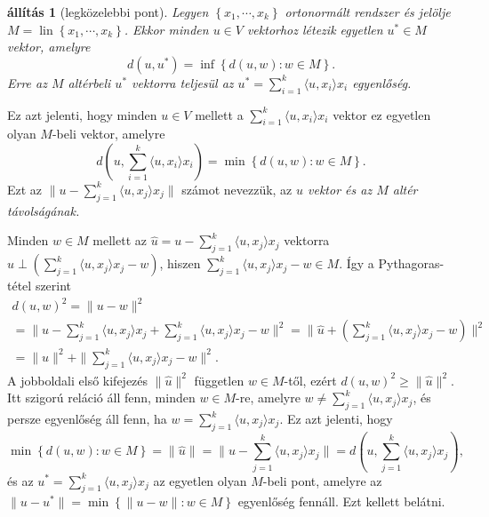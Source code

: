 \documentclass[9pt, a4paper, showtrims]{memoir}
\makeatletter
\renewenvironment{proof}[1][\proofname]
    {\par\pushQED{\qed}%
    \normalfont \topsep6\p@\@plus6\p@\relax
    \trivlist
    \item[\hskip\labelsep
        \itshape
    #1\@addpunct{:}]\ignorespaces}
    {\popQED\endtrivlist\@endpefalse}
\theoremstyle{plain}
\newtheorem{proposition}{állítás}[chapter]
\theoremstyle{remark}
\theoremstyle{definition}
\DeclareMathOperator{\lin}{lin}
\newcommand{\ip}[2]{\langle#1,#2\rangle}
\makeatother
\begin{document}
\begin{proposition}[legközelebbi pont]\label{pr:legkozelebb}
	Legyen $\left\{ x_1,\cdots,x_k \right\}$ ortonormált rendszer és
	jelölje $M=\lin\left\{ x_1,\cdots,x_k \right\}$.
	Ekkor minden $u\in V$ vektorhoz létezik egyetlen $u^\ast\in M$
	vektor, amelyre
	\[
		d\left( u,u^\ast\right)
		=
		\inf\left\{ d\left( u,w \right):w\in M \right\}.
	\]
	Erre az $M$ altérbeli $u^\ast$ vektorra teljesül az $u^\ast=\sum_{i=1}^k\ip{u}{x_i}x_i$ egyenlőség.
\end{proposition}
Ez azt jelenti,
hogy minden $u\in V$ mellett a
$\sum_{i=1}^k\ip{u}{x_i}x_i$
vektor ez egyetlen olyan $M$-beli vektor, amelyre
\[
	d\left( u,\sum_{i=1}^k\ip{u}{x_i}x_i \right)
	=
	\min\left\{ d\left( u,w \right):w\in M \right\}.
\]
Ezt az
\begin{math}
	\|u-\sum_{j=1}^k\ip{u}{x_j}x_j\|
\end{math}
számot nevezzük, az \emph{$u$ vektor és az $M$ altér távolságának.}
\begin{proof}
	Minden $w\in M$ mellett az $\hat{u}=u-\sum_{j=1}^k\ip{u}{x_j}x_j$ vektorra
	$\hat{u}\perp \left( \sum_{j=1}^k\ip{u}{x_j}x_j-w \right)$,
	hiszen $\sum_{j=1}^k\ip{u}{x_j}x_j-w\in M$.
	Így a Pythagoras-tétel szerint
	\begin{multline*}
		d\left( u,w \right)^2
		=
		\|u-w\|^2
		\\
		=
		\|u-\sum_{j=1}^k\ip{u}{x_j}x_j+\sum_{j=1}^k\ip{u}{x_j}x_j-w\|^2
		=
		\|\hat{u}+\left( \sum_{j=1}^k\ip{u}{x_j}x_j-w \right)\|^2
		\\
		=
		\|\hat{u}\|^2+\|\sum_{j=1}^k\ip{u}{x_j}x_j-w\|^2.
	\end{multline*}
	A jobboldali első kifejezés $\|\hat{u}\|^2$ független $w\in M$-től,
	ezért
	\begin{math}
		d\left( u,w \right)^2
		\geq
		\|\hat{u}\|^2.
	\end{math}
	Itt szigorú reláció áll fenn, minden $w\in M$-re, amelyre
	$w\neq\sum_{j=1}^k\ip{u}{x_j}x_j $,
	és persze egyenlőség áll fenn, ha
	$w=\sum_{j=1}^k\ip{u}{x_j}x_j $.
	Ez azt jelenti,
	hogy
	\[
		\min\left\{ d\left( u,w \right):w\in M \right\}
		=
		\|\hat{u}\|
		=
		\| u-\sum_{j=1}^k\ip{u}{x_j}x_j\|
		=
		d\left( u,\sum_{j=1}^k\ip{u}{x_j}x_j\right),
	\]
	és az $u^\ast=\sum_{j=1}^k\ip{u}{x_j}x_j $ az egyetlen olyan $M$-beli pont, amelyre
	az
	$\|u-u^\ast\|=\min\left\{ \|u-w\|:w\in M  \right\}$ egyenlőség fennáll.
	Ezt kellett belátni.
\end{proof}
\end{document}
